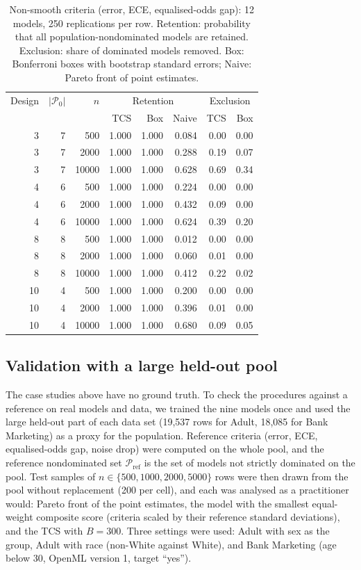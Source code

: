 \documentclass[pdflatex,sn-mathphys-num,iicol]{sn-jnl}
\theoremstyle{thmstyleone}
\theoremstyle{thmstyletwo}
\begin{document}
\begin{table}[t]\centering\small
\caption{Non-smooth criteria (error, ECE, equalised-odds gap): 12 models, 250 replications per row. Retention: probability that all population-nondominated models are retained. Exclusion: share of dominated models removed. Box: Bonferroni boxes with bootstrap standard errors; Naive: Pareto front of point estimates.}\label{tab:nonsmooth}
\begin{tabular}{rrrrrrrr}\toprule
Design & $|\mathcal{P}_0|$ & $n$ & \multicolumn{3}{c}{Retention} & \multicolumn{2}{c}{Exclusion} \\
 & & & TCS & Box & Naive & TCS & Box \\\midrule
3 & 7 & 500 & 1.000 & 1.000 & 0.084 & 0.00 & 0.00 \\
3 & 7 & 2000 & 1.000 & 1.000 & 0.288 & 0.19 & 0.07 \\
3 & 7 & 10000 & 1.000 & 1.000 & 0.628 & 0.69 & 0.34 \\
4 & 6 & 500 & 1.000 & 1.000 & 0.224 & 0.00 & 0.00 \\
4 & 6 & 2000 & 1.000 & 1.000 & 0.432 & 0.09 & 0.00 \\
4 & 6 & 10000 & 1.000 & 1.000 & 0.624 & 0.39 & 0.20 \\
8 & 8 & 500 & 1.000 & 1.000 & 0.012 & 0.00 & 0.00 \\
8 & 8 & 2000 & 1.000 & 1.000 & 0.060 & 0.01 & 0.00 \\
8 & 8 & 10000 & 1.000 & 1.000 & 0.412 & 0.22 & 0.02 \\
10 & 4 & 500 & 1.000 & 1.000 & 0.200 & 0.00 & 0.00 \\
10 & 4 & 2000 & 1.000 & 1.000 & 0.396 & 0.01 & 0.00 \\
10 & 4 & 10000 & 1.000 & 1.000 & 0.680 & 0.09 & 0.05 \\
\bottomrule\end{tabular}
\end{table}

\subsection{Validation with a large held-out pool}\label{sec:realval}
The case studies above have no ground truth. To check the procedures against a reference on real models and data, we trained the nine models once and used the large held-out part of each data set (19,537 rows for Adult, 18,085 for Bank Marketing) as a proxy for the population. Reference criteria (error, ECE, equalised-odds gap, noise drop) were computed on the whole pool, and the reference nondominated set $\mathcal{P}_{\mathrm{ref}}$ is the set of models not strictly dominated on the pool. Test samples of $n\in\{500,1000,2000,5000\}$ rows were then drawn from the pool without replacement (200 per cell), and each was analysed as a practitioner would: Pareto front of the point estimates, the model with the smallest equal-weight composite score (criteria scaled by their reference standard deviations), and the TCS with $B=300$. Three settings were used: Adult with sex as the group, Adult with race (non-White against White), and Bank Marketing (age below 30, OpenML version 1, target ``yes'').
\end{document}

